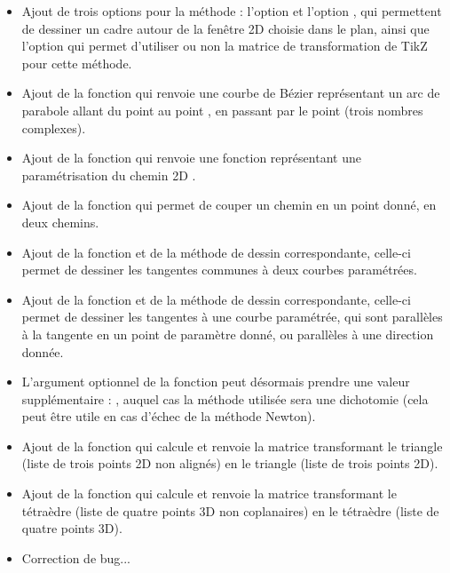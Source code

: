 \begin{itemize}
    \item Ajout de trois options pour la méthode  : l'option  et l'option , qui permettent de dessiner un cadre autour de la fenêtre 2D choisie dans le plan, ainsi que l'option  qui permet d'utiliser ou non la matrice de transformation de TikZ pour cette méthode.
    
    \item Ajout de la fonction  qui renvoie une courbe de Bézier représentant un arc de parabole allant du point  au point , en passant par le point  (trois nombres complexes).
    
    \item Ajout de la fonction  qui renvoie une fonction représentant une paramétrisation du chemin 2D .
    
    \item Ajout de la fonction  qui permet de couper un chemin en un point donné, en deux chemins.    

    \item Ajout de la fonction  et de la méthode de dessin  correspondante, celle-ci permet de dessiner les tangentes communes à deux courbes paramétrées.
    
    \item Ajout de la fonction  et de la méthode de dessin  correspondante, celle-ci permet de dessiner les tangentes à une courbe paramétrée, qui sont parallèles à la tangente en un point de paramètre donné, ou parallèles à une direction donnée.
    
    \item L'argument optionnel de la fonction  peut désormais prendre une valeur supplémentaire : , auquel cas la méthode utilisée sera une dichotomie (cela peut être utile en cas d'échec de la méthode Newton).

    \item Ajout de la fonction  qui calcule et renvoie la matrice transformant le triangle  (liste de trois points 2D non alignés) en le triangle  (liste de trois points 2D).

    \item Ajout de la fonction  qui calcule et renvoie la matrice transformant le tétraèdre  (liste de quatre points 3D non coplanaires) en le tétraèdre  (liste de quatre points 3D).
    
    \item Correction de bug...
\end{itemize}


